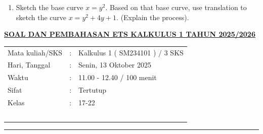 \documentclass[10pt,openany,a4paper]{article}
\theoremstyle{definition}
\theoremstyle{definition}
\theoremstyle{plain}
\begin{document}
\begin{enumerate}
    \item Sketch the base curve \(x = y^2\). Based on that base curve, use translation to sketch the curve \(x = y^2 + 4y + 1\). (Explain the process).

        \end{enumerate}
               \newpage
 \begin{center}
	{\underline{\textbf{\MakeUppercase{Soal dan Pembahasan ETS Kalkulus 1 Tahun 2025/2026}}}}
    \end{center}

    \begin{center}
	\begin{tabular}{lcl}
		Mata kuliah/SKS & : & Kalkulus 1 ( SM234101 ) / 3 SKS\\
		Hari, Tanggal & : & Senin, 13 Oktober 2025\\
		Waktu & : & 11.00 - 12.40 / 100 menit\\
		Sifat & : & Tertutup\\
		Kelas & : & 17-22\\
  ~
	\end{tabular}
    
    \noindent\rule{\textwidth}{2.pt}
        \end{center}
\end{document}
